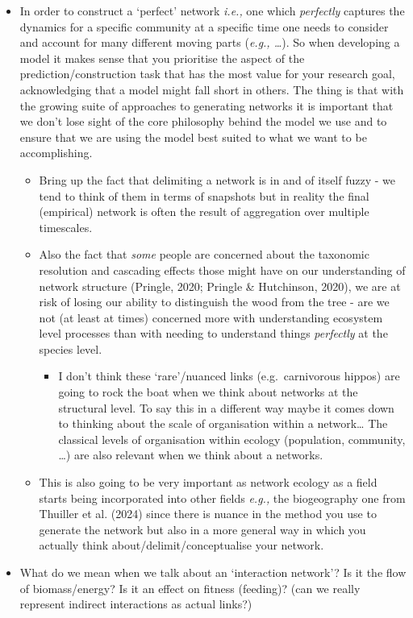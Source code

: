 \documentclass[
]{agujournal2019}
\providecommand{\tightlist}{%
  \setlength{\itemsep}{0pt}\setlength{\parskip}{0pt}}\usepackage{longtable,booktabs,array}
\begin{document}
\begin{itemize}
\item
  In order to construct a `perfect' network \emph{i.e.,} one which
  \emph{perfectly} captures the dynamics for a specific community at a
  specific time one needs to consider and account for many different
  moving parts (\emph{e.g., \ldots{}}). So when developing a model it
  makes sense that you prioritise the aspect of the
  prediction/construction task that has the most value for your research
  goal, acknowledging that a model might fall short in others. The thing
  is that with the growing suite of approaches to generating networks it
  is important that we don't lose sight of the core philosophy behind
  the model we use and to ensure that we are using the model best suited
  to what we want to be accomplishing.

  \begin{itemize}
  \tightlist
  \item
    Bring up the fact that delimiting a network is in and of itself
    fuzzy - we tend to think of them in terms of snapshots but in
    reality the final (empirical) network is often the result of
    aggregation over multiple timescales.
  \item
    Also the fact that \emph{some} people are concerned about the
    taxonomic resolution and cascading effects those might have on our
    understanding of network structure (Pringle, 2020; Pringle \&
    Hutchinson, 2020), we are at risk of losing our ability to
    distinguish the wood from the tree - are we not (at least at times)
    concerned more with understanding ecosystem level processes than
    with needing to understand things \emph{perfectly} at the species
    level.

    \begin{itemize}
    \tightlist
    \item
      I don't think these `rare'/nuanced links (e.g.~carnivorous hippos)
      are going to rock the boat when we think about networks at the
      structural level. To say this in a different way maybe it comes
      down to thinking about the scale of organisation within a
      network\ldots{} The classical levels of organisation within
      ecology (population, community, \ldots) are also relevant when we
      think about a networks.
    \end{itemize}
  \item
    This is also going to be very important as network ecology as a
    field starts being incorporated into other fields \emph{e.g.,} the
    biogeography one from Thuiller et al. (2024) since there is nuance
    in the method you use to generate the network but also in a more
    general way in which you actually think about/delimit/conceptualise
    your network.
  \end{itemize}
\item
  What do we mean when we talk about an `interaction network'? Is it the
  flow of biomass/energy? Is it an effect on fitness (feeding)? (can we
  really represent indirect interactions as actual links?)


\end{itemize}
\end{document}
